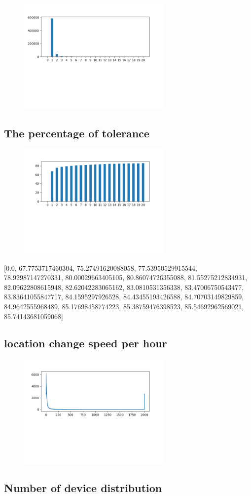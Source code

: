 \documentclass[10pt, conference, compsocconf]{IEEEtran}
\begin{document}
\begin{figure}[H]\centering\includegraphics[width=75mm,scale=0.5]{BasedonClientIDnumberofusersfingerprint}\end{figure}\subsection{The percentage of tolerance}
\begin{figure}[H]\centering\includegraphics[width=75mm,scale=0.5]{BasedonClientIDtolerance}\end{figure}[0.0, 67.7753717460304, 75.27491620088058, 77.53950529915544, 78.92987147270331, 80.00029663405105, 80.86074726355088, 81.55275212834931, 82.09622808615948, 82.62042283065162, 83.0810531356338, 83.47006750543477, 83.83641055847717, 84.1595297926528, 84.43455193426588, 84.70703149829859, 84.9642555968489, 85.17698458774223, 85.38759476398523, 85.54692962569021, 85.74143681059068]\subsection{location change speed per hour}
\begin{figure}[H]\centering\includegraphics[width=75mm,scale=0.5]{BasedonClientIDlocationchange}\end{figure}\subsection{Number of device distribution}
\end{document}
